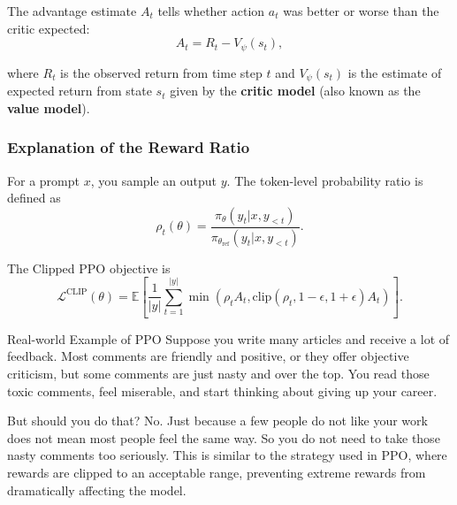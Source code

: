 The advantage estimate \(A_t\) tells whether action \(a_t\) was better or worse than the critic expected:
\begin{equation}
	A_t = R_t - V_\psi(s_t),
\end{equation}

where \(R_t\) is the observed return from time step \(t\) and \(V_\psi(s_t)\) is the estimate of expected return from state \(s_t\) given by the \textbf{critic model} (also known as the \textbf{value model}).

\subsubsection{Explanation of the Reward Ratio}
For a prompt \(x\), you sample an output \(y\). The token-level probability ratio is defined as
\begin{equation}
	\rho_t(\theta) =
	\frac{\pi_\theta(y_t | x, y_{< t})}{\pi_{\theta_\text{ref}}(y_t | x, y_{< t})}.
\end{equation}

The Clipped PPO objective is
\begin{equation}
	\mathcal{L}^{\text{CLIP}}(\theta) = \mathbb{E}
	\left[
		\frac{1}{|y|} \sum_{t = 1}^{|y|} \min \left( \rho_t A_t, \text{clip}(\rho_t, 1-\epsilon, 1 + \epsilon)A_t \right)
		\right].
\end{equation}

\begin{NoteBox}{Real-world Example of PPO}
	Suppose you write many articles and receive a lot of feedback. Most comments are friendly and positive, or they offer objective criticism, but some comments are just nasty and over the top. You read those toxic comments, feel miserable, and start thinking about giving up your career.
	\medskip

	But should you do that? No. Just because a few people do not like your work does not mean most people feel the same way. So you do not need to take those nasty comments too seriously. This is similar to the strategy used in PPO, where rewards are clipped to an acceptable range, preventing extreme rewards from dramatically affecting the model.
\end{NoteBox}
